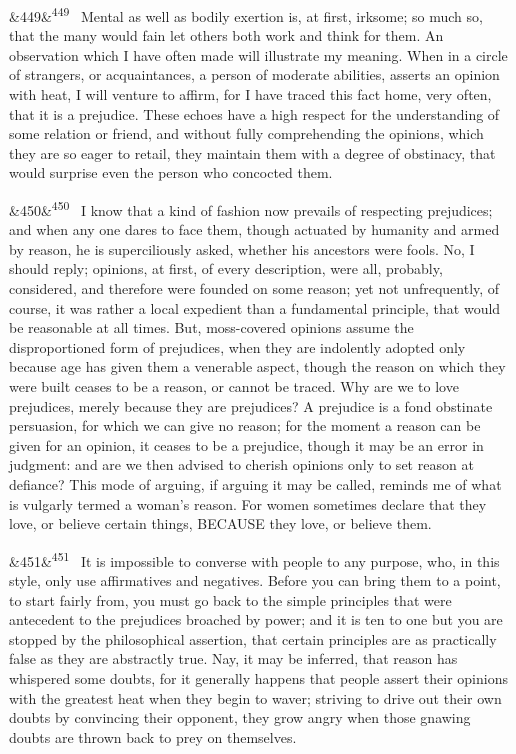 \documentclass[12pt]{article}
\newcommand{\para}[1][]{\par\noindent\ifx&#1&\else\textsuperscript{\footnotesize #1}~\fi}
\begin{document}
\para[449] Mental as well as bodily exertion is, at first, irksome; so much so, that the many would fain let others both work and think for them. An observation which I have often made will illustrate my meaning. When in a circle of strangers, or acquaintances, a person of moderate abilities, asserts an opinion with heat, I will venture to affirm, for I have traced this fact home, very often, that it is a prejudice. These echoes have a high respect for the understanding of some relation or friend, and without fully comprehending the opinions, which they are so eager to retail, they maintain them with a degree of obstinacy, that would surprise even the person who concocted them.

\para[450] I know that a kind of fashion now prevails of respecting prejudices; and when any one dares to face them, though actuated by humanity and armed by reason, he is superciliously asked, whether his ancestors were fools. No, I should reply; opinions, at first, of every description, were all, probably, considered, and therefore were founded on some reason; yet not unfrequently, of course, it was rather a local expedient than a fundamental principle, that would be reasonable at all times. But, moss-covered opinions assume the disproportioned form of prejudices, when they are indolently adopted only because age has given them a venerable aspect, though the reason on which they were built ceases to be a reason, or cannot be traced. Why are we to love prejudices, merely because they are prejudices? A prejudice is a fond obstinate persuasion, for which we can give no reason; for the moment a reason can be given for an opinion, it ceases to be a prejudice, though it may be an error in judgment: and are we then advised to cherish opinions only to set reason at defiance? This mode of arguing, if arguing it may be called, reminds me of what is vulgarly termed a woman's reason. For women sometimes declare that they love, or believe certain things, BECAUSE they love, or believe them.

\para[451] It is impossible to converse with people to any purpose, who, in this style, only use affirmatives and negatives. Before you can bring them to a point, to start fairly from, you must go back to the simple principles that were antecedent to the prejudices broached by power; and it is ten to one but you are stopped by the philosophical assertion, that certain principles are as practically false as they are abstractly true. Nay, it may be inferred, that reason has whispered some doubts, for it generally happens that people assert their opinions with the greatest heat when they begin to waver; striving to drive out their own doubts by convincing their opponent, they grow angry when those gnawing doubts are thrown back to prey on themselves.
\end{document}
